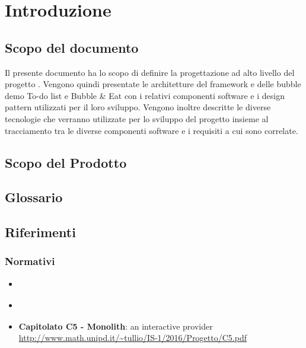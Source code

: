\section{Introduzione}

\subsection{Scopo del documento}
Il presente documento ha lo scopo di definire la progettazione ad alto livello del progetto \ProjectName{}. Vengono quindi presentate le architetture del framework e delle bubble demo To-do list e Bubble \& Eat con i relativi componenti software e i design pattern utilizzati per il loro sviluppo. Vengono inoltre descritte le diverse tecnologie che verranno utilizzate per lo sviluppo del progetto insieme al tracciamento tra le diverse componenti software e i requisiti a cui sono correlate.

\subsection{Scopo del Prodotto}
\ScopoDelProdotto

\subsection{Glossario}
\GlossarioIntroduzione

\subsection{Riferimenti}
\subsubsection{Normativi}
\begin{itemize}
	\item \textbf{\NormeDiProgetto}
	\item \textbf{\AnalisiDeiRequisiti}
	\item \textbf{Capitolato C5 - Monolith}: an interactive provider\\
	 \url{http://www.math.unipd.it/~tullio/IS-1/2016/Progetto/C5.pdf}
\end{itemize}
